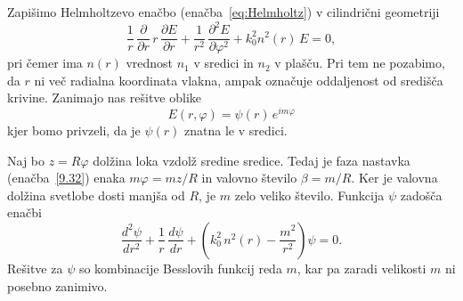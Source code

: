 Zapišimo Helmholtzevo enačbo (enačba~\ref{eq:Helmholtz}) v cilindrični 
geometriji
\begin{equation}
\frac{1}{r}\,\frac{\partial}{\partial r}\, r\,\frac{\partial E}{\partial r}
+\frac{1}{r^{2}}\,\frac{\partial^{2}E}{\partial\varphi^{2}}+k_{0}^{2}n^{2}\left(r\right)\, E=0,
\label{9.31}
\end{equation}
pri čemer ima $n\left(r\right)$ vrednost $n_{1}$ v sredici in $n_{2}$ v plašču. 
Pri tem ne pozabimo, da $r$ ni več radialna koordinata vlakna, ampak
označuje oddaljenost od središča krivine. Zanimajo nas rešitve oblike 
\begin{equation}
E(r, \varphi) =\psi\left(r\right)\, e^{im\varphi}
\label{9.32}
\end{equation}
kjer bomo privzeli, da je $\psi\left(r\right)$ znatna le v sredici. 

Naj bo $z=R\varphi$ dolžina loka vzdolž sredine sredice. Tedaj je faza nastavka
(enačba~\ref{9.32}) enaka $m\varphi = m z/R$ in valovno število $\beta = m/R$.
Ker je valovna dolžina svetlobe dosti manjša od $R$, je $m$ zelo veliko število. 
Funkcija $\psi$ zadošča enačbi 
\begin{equation}
\frac{d^{2}\psi}{dr^{2}}+\frac{1}{r}\,\frac{d\psi}{dr}+\left(k_{0}^{2}\, 
n^{2}\left(r\right)-\frac{m^{2}}{r^{2}}\right)\psi=0.
\label{9.33}
\end{equation}
Rešitve za $\psi$ so kombinacije Besslovih funkcij reda $m$, kar
pa zaradi velikosti $m$ ni posebno zanimivo. 


